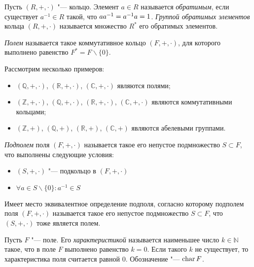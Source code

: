     \begin{definition}
    	Пусть $(R, +, \cdot)$ "--- кольцо. Элемент $a \in R$ называется \textit{обратимым}, если существует $a^{-1} \in R$ такой, что $aa^{-1} \hm{=} a^{-1}a = 1$. \textit{Группой обратимых элементов} кольца $(R, +, \cdot)$ называется множество $R^*$ его обратимых элементов.
    \end{definition}
    
    \begin{definition}
    	\textit{Полем} называется такое коммутативное кольцо $(F, +, \cdot)$, для которого выполнено равенство $F^* = F\backslash\{0\}$.
    \end{definition}
    
    \begin{example}
    	Рассмотрим несколько примеров:
    	\begin{itemize}
    		\item $(\mathbb{Q}, +, \cdot)$, $(\mathbb{R}, +, \cdot)$, $(\mathbb{C}, +, \cdot)$ являются полями;
    		\item $(\mathbb{Z}, +, \cdot)$, $(\mathbb{Q}, +, \cdot)$, $(\mathbb{R}, +, \cdot)$, $(\mathbb{C}, +, \cdot)$ являются коммутативными кольцами;
                \item $(\mathbb{Z}, +)$, $(\mathbb{Q}, +)$, $(\mathbb{R}, +)$, $(\mathbb{C}, +)$ являются абелевыми группами.
    	\end{itemize}
    \end{example}
    
    \begin{definition}
    	\textit{Подполем} поля $(F, +, \cdot)$ называется такое его непустое подмножество $S \subset F$, что выполнены следующие условия:
    	\begin{itemize}
    		\item $(S, +, \cdot)$ "--- подкольцо в $(F, +, \cdot)$
    		\item $\forall a \in S\backslash\{0\}: a^{-1} \in S$
    	\end{itemize}
    \end{definition}
    
    \begin{note}
    	Имеет место эквивалентное определение подполя, согласно которому подполем поля $(F, +, \cdot)$ называется такое его непустое подмножество $S \subset F$, что $(S, +, \cdot)$ тоже является полем.
    \end{note}
    
    \begin{definition}
    	Пусть $F$ "--- поле. Его \textit{характеристикой} называется наименьшее число $k \in \mathbb{N}$ такое, что в поле $F$ выполнено равенство $k = 0$. Если такого $k$ не существует, то характеристика поля считается равной $0$. Обозначение "--- $\operatorname{char}{F}$.
    \end{definition}
    
